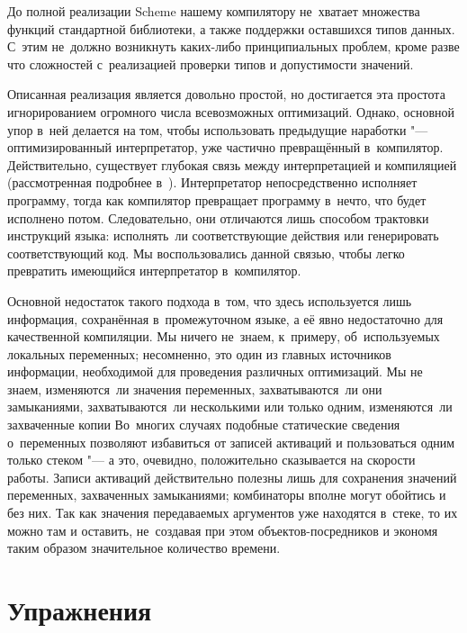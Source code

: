 До полной реализации Scheme нашему компилятору не~хватает множества функций
стандартной библиотеки, а также поддержки оставшихся типов данных. С~этим
не~должно возникнуть каких-либо принципиальных проблем, кроме разве что
сложностей с~реализацией проверки типов и допустимости значений.

Описанная реализация является довольно простой, но достигается эта простота
игнорированием огромного числа всевозможных оптимизаций. Однако, основной упор
в~ней делается на том, чтобы использовать предыдущие наработки "---
оптимизированный интерпретатор, уже частично превращённый в~компилятор.
Действительно, существует глубокая связь между интерпретацией и компиляцией
(рассмотренная подробнее в~\cite{nei84}). Интерпретатор непосредственно
исполняет программу, тогда как компилятор превращает программу в~нечто, что
будет исполнено потом. Следовательно, они отличаются лишь способом трактовки
инструкций языка: исполнять~ли соответствующие действия или генерировать
соответствующий код. Мы воспользовались данной связью, чтобы легко превратить
имеющийся интерпретатор в~компилятор.

Основной недостаток такого подхода в~том, что здесь используется лишь
информация, сохранённая в~промежуточном языке, а её явно недостаточно для
качественной компиляции. Мы ничего не~знаем, к~примеру, об~используемых
локальных переменных; несомненно, это один из главных источников информации,
необходимой для проведения различных оптимизаций. Мы не знаем, изменяются~ли
значения переменных, захватываются~ли они замыканиями, захватываются~ли
несколькими или только одним, изменяются~ли захваченные копии {\itd} Во~многих
случаях подобные статические сведения о~переменных позволяют избавиться от
записей активаций и пользоваться одним только стеком "--- а это, очевидно,
положительно сказывается на скорости работы. Записи активаций действительно
полезны лишь для сохранения значений переменных, захваченных замыканиями;
комбинаторы вполне могут обойтись и без них. Так как значения передаваемых
аргументов уже находятся в~стеке, то их можно там и оставить, не~создавая при
этом объектов-посредников и экономя таким образом значительное количество
времени.


\section{Упражнения}\label{compilation/sect:exercises}


